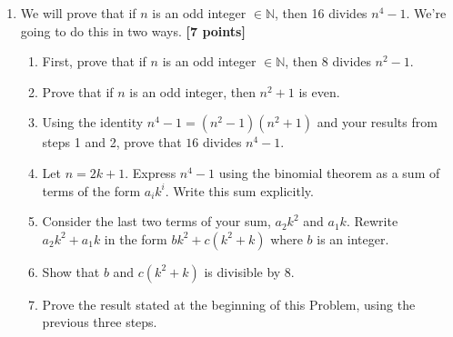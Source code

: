 \documentclass{article}
\begin{document}
\begin{enumerate}
\begin{enumerate}
    Since they are \(\geq\) and \(\leq\), they must be equal. 
    \item Consider the set of all positive numbers that \(ax+by\) form given that \(a,b\) are nonzero and \(x,y\) are in the integers. This set is nonempty since at least one of the two \(a,b\) is nonzero. By the Well Ordering Principle, there must exist a least element. Call this least element \(d\). By the division algorithm, we know that 
    \begin{equation}
        \begin{split}
            a &= dq_a+r_a\\
            b &= dq_b+r_b
        \end{split}
    \end{equation}
    for some \(q_a,q_b\in \mathbb Z\) and \(r_a,r_b\in\{0,\dots, d-1\}\). We will work with \(r=r_a, q=q_a\) and the proof proceeds without loss of generality with \(b\). 
    $$r = a - dq$$$$r = a - (ax + by)q$$ $$r = a(1 - xq) + b(-yq)$$ 
    This shows that $r$ is also a linear combination of $a$ and $b$. If $r > 0$, then $r$ would be an element of $S$. However, we stated that $d$ is the smallest positive element of $S$, and the division algorithm tells us $r < d$. The only way to avoid a contradiction is if $r = 0$. Therefore, $d \mid a$. By the same logic, $d \mid b$. Thus, $d$ is a common divisor of $a$ and $b$.
\end{enumerate}



\item We will prove that if $n$ is an odd integer $\in \mathbb{N}$, then 16 divides $n^4 - 1$. We're going to do this in two ways. \textbf{[7 points]} 
\begin{enumerate}
    \item First, prove that if $n$ is an odd integer $\in \mathbb{N}$, then 8 divides $n^2 - 1$.
    \item Prove that if $n$ is an odd integer, then $n^2+1$ is even.
    \item Using the identity $n^4 - 1 = (n^2 - 1)(n^2 + 1)$ and your results from steps 1 and 2, prove that $16$ divides $n^4 - 1$.
    
    \item Let $n = 2k + 1$. Express $n^4 - 1$ using the binomial theorem as a sum of terms of the form $a_i k^i$. Write this sum explicitly.
    \item Consider the last two terms of your sum, $a_2 k^2$ and $a_1 k$. Rewrite $a_2 k^2 + a_1 k$ in the form $b k^2 + c(k^2 + k)$ where $b$ is an integer.
    \item Show that $b$ and \(c(k^2+k)\) is divisible by 8.
    \item Prove the result stated at the beginning of this Problem, using the previous three steps. 
\end{enumerate}


\end{enumerate}
\end{document}
